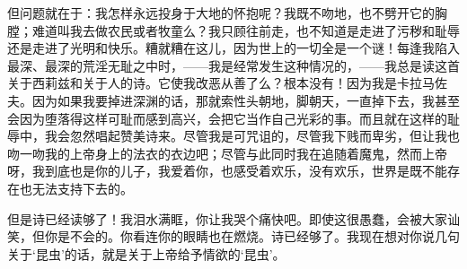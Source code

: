 \par 但问题就在于：我怎样永远投身于大地的怀抱呢？我既不吻地，也不劈开它的胸膛；难道叫我去做农民或者牧童么？我只顾往前走，也不知道是走进了污秽和耻辱还是走进了光明和快乐。糟就糟在这儿，因为世上的一切全是一个谜！每逢我陷入最深、最深的荒淫无耻之中时，——我是经常发生这种情况的，——我总是读这首关于西莉兹和关于人的诗。它使我改恶从善了么？根本没有！因为我是卡拉马佐夫。因为如果我要掉进深渊的话，那就索性头朝地，脚朝天，一直掉下去，我甚至会因为堕落得这样可耻而感到高兴，会把它当作自己光彩的事。而且就在这样的耻辱中，我会忽然唱起赞美诗来。尽管我是可咒诅的，尽管我下贱而卑劣，但让我也吻一吻我的上帝身上的法衣的衣边吧；尽管与此同时我在追随着魔鬼，然而上帝呀，我到底也是你的儿子，我爱着你，也感受着欢乐，没有欢乐，世界是既不能存在也无法支持下去的。
\par 但是诗已经读够了！我泪水满眶，你让我哭个痛快吧。即使这很愚蠢，会被大家讪笑，但你是不会的。你看连你的眼睛也在燃烧。诗已经够了。我现在想对你说几句关于‘昆虫’的话，就是关于上帝给予情欲的‘昆虫’。
